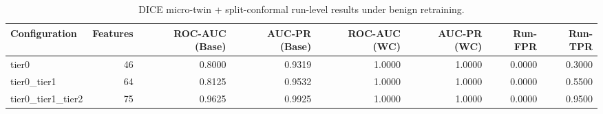 \begin{table}[t]
\centering
\caption{DICE micro-twin + split-conformal run-level results under benign retraining.}
\label{tab:dice_full_overall}
\footnotesize
\begin{tabular}{lrrrrrrr}
\toprule
Configuration & Features & ROC-AUC (Base) & AUC-PR (Base) & ROC-AUC (WC) & AUC-PR (WC) & Run-FPR & Run-TPR \\
\midrule
tier0 & 46 & 0.8000 & 0.9319 & 1.0000 & 1.0000 & 0.0000 & 0.3000 \\
tier0_tier1 & 64 & 0.8125 & 0.9532 & 1.0000 & 1.0000 & 0.0000 & 0.5500 \\
tier0_tier1_tier2 & 75 & 0.9625 & 0.9925 & 1.0000 & 1.0000 & 0.0000 & 0.9500 \\
\bottomrule
\end{tabular}

\end{table}
